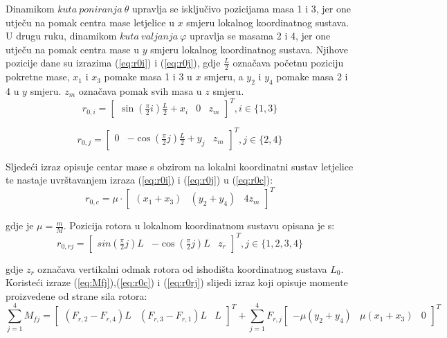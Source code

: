 \documentclass[11pt,a4paper]{article}
\begin{document}
Dinamikom $kuta \ poniranja \ \theta$ upravlja se isključivo pozicijama masa 1 i 3, jer one utječu na pomak centra mase letjelice u $x$ smjeru lokalnog koordinatnog sustava. U drugu ruku, dinamikom $kuta \ valjanja \ \varphi$ upravlja se masama 2 i 4, jer one utječu na pomak centra mase u $y$ smjeru lokalnog koordinatnog sustava. Njihove pozicije dane su izrazima (\ref{eq:r0i}) i (\ref{eq:r0j}), gdje $\frac{L}{2}$ označava početnu poziciju pokretne mase, $x_{1}$ i $x_{3}$ pomake masa 1 i 3 u $x$ smjeru, a $y_{2}$ i $y_{4}$ pomake masa 2 i 4 u $y$ smjeru. $z_{m}$ označava pomak svih masa u $z$ smjeru.
\begin{equation}
r_{0,i} = \left[
\begin{matrix}
\sin\left(\frac{\pi}{2}i\right)\frac{L}{2} + x_{i} & 0 & z_{m}
\end{matrix} \right] ^{T}, i \in \{ 1, 3\}
\label{eq:r0i}
\end{equation}

\begin{equation}
r_{0,j} = \left[
\begin{matrix}
0 & -\cos\left(\frac{\pi}{2}j\right)\frac{L}{2} + y_{j} & z_{m}
\end{matrix} \right] ^{T}, j \in \{ 2, 4\}
\label{eq:r0j}
\end{equation}

 
Sljedeći izraz opisuje centar mase s obzirom na lokalni koordinatni sustav letjelice te nastaje uvrštavanjem izraza (\ref{eq:r0i}) i (\ref{eq:r0j}) u (\ref{eq:r0c}):
\begin{equation}
r_{0,c} = \mu \cdot \left[
\begin{matrix}
(x_{1} + x_{3}) & (y_{2} + y_{4}) & 4z_{m}
\end{matrix} \right]^{T}
\label{eq:r0c}
\end{equation}

gdje je $\mu = \frac{m}{M}$. Pozicija rotora u lokalnom koordinatnom sustavu opisana je s:
\begin{equation}
r_{0,rj} = \left[
\begin{matrix}
sin\left(\frac{\pi}{2}j\right)L & -\cos\left(\frac{\pi}{2}j\right)L & z_{r}
\end{matrix} \right] ^{T}, j \in \{ 1, 2, 3, 4\}
\label{eq:r0rj}
\end{equation}

gdje $z_{r}$ označava vertikalni odmak rotora od ishodišta koordinatnog sustava $L_{0}$. Koristeći izraze (\ref{eq:Mfj}),(\ref{eq:r0c}) i (\ref{eq:r0rj}) slijedi izraz koji opisuje momente proizvedene od strane sila rotora:
\begin{equation}
\sum_{j=1}^{4}M_{fj} = \left[
\begin{matrix}
(F_{r,2} - F_{r,4})L & (F_{r,3} - F_{r,1})L & L
\end{matrix}\right]^{T} + \sum_{j=1}^{4}F_{r,j} 
\left[\begin{matrix}
-\mu(y_{2} + y_{4}) & \mu(x_{1} + x_{3}) & 0
\end{matrix}\right]^{T}
\label{eq:sumaMfj}
\end{equation}
\end{document}
